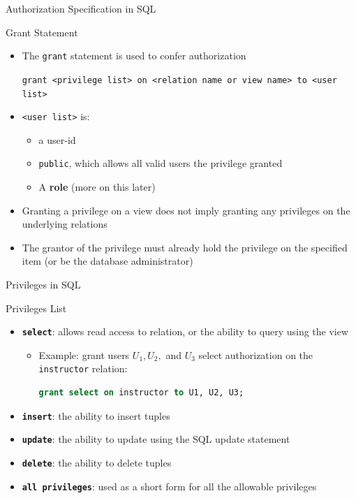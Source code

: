 \documentclass[aspectratio=169, xcolor=dvipsnames]{beamer}
\begin{document}
\begin{frame}{Authorization Specification in SQL}
    \begin{block}{Grant Statement}
        \begin{itemize}[<+->]
            \item The \texttt{grant} statement is used to confer authorization
            \begin{center}
            \texttt{grant <privilege list> on <relation name or view name> to <user list>}
            \end{center}
            \item \texttt{<user list>} is:
            \begin{itemize}
                \item[$\triangleright$] a user-id
                \item[$\triangleright$] \texttt{public}, which allows all valid users the privilege granted
                \item[$\triangleright$] A \textbf{role} (more on this later)
            \end{itemize}
            \item Granting a privilege on a view does not imply granting any privileges on the underlying relations
            \item The grantor of the privilege must already hold the privilege on the specified item (or be the database administrator)
        \end{itemize}
    \end{block}
\end{frame}

\begin{frame}[fragile]{Privileges in SQL}
    \begin{block}{Privileges List}
        \begin{itemize}[<+->]
            \item \textbf{\texttt{select}}: allows read access to relation, or the ability to query using the view
            \begin{itemize}
                \item[$\triangleright$] Example: grant users $U_1, U_2,$ and $U_3$ select authorization on the \texttt{instructor} relation:
                \begin{lstlisting}[language=SQL]
grant select on instructor to U1, U2, U3;
                \end{lstlisting}
            \end{itemize}
            \item \textbf{\texttt{insert}}: the ability to insert tuples
            \item \textbf{\texttt{update}}: the ability to update using the SQL update statement
            \item \textbf{\texttt{delete}}: the ability to delete tuples
            \item \textbf{\texttt{all privileges}}: used as a short form for all the allowable privileges
        \end{itemize}
    \end{block}
\end{frame}
\end{document}
